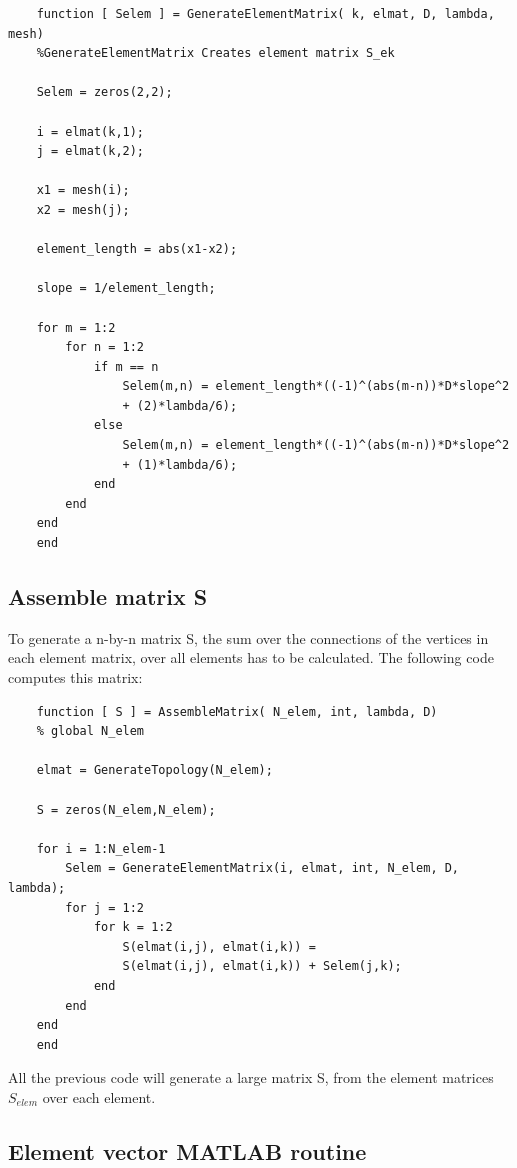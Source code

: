 \documentclass[a4paper]{report}
\begin{document}
\begin{lstlisting}
	function [ Selem ] = GenerateElementMatrix( k, elmat, D, lambda, mesh)
	%GenerateElementMatrix Creates element matrix S_ek
		
	Selem = zeros(2,2);
	
	i = elmat(k,1);
	j = elmat(k,2);
	
	x1 = mesh(i);
	x2 = mesh(j);
	
	element_length = abs(x1-x2);
	
	slope = 1/element_length; 
	
	for m = 1:2
		for n = 1:2
			if m == n
				Selem(m,n) = element_length*((-1)^(abs(m-n))*D*slope^2
				+ (2)*lambda/6);
			else
				Selem(m,n) = element_length*((-1)^(abs(m-n))*D*slope^2
				+ (1)*lambda/6);
			end
		end
	end
	end
\end{lstlisting}

\bigskip




\subsection{Assemble matrix S}
To generate a n-by-n matrix S, the sum over the connections of the vertices in each element matrix, over all elements has to be calculated. The following code computes this matrix:

\begin{lstlisting}
	function [ S ] = AssembleMatrix( N_elem, int, lambda, D)
	% global N_elem 
	
	elmat = GenerateTopology(N_elem);
	
	S = zeros(N_elem,N_elem);
	
	for i = 1:N_elem-1
		Selem = GenerateElementMatrix(i, elmat, int, N_elem, D, lambda);
		for j = 1:2
			for k = 1:2
				S(elmat(i,j), elmat(i,k)) =
				S(elmat(i,j), elmat(i,k)) +	Selem(j,k);
			end
		end
	end
	end

\end{lstlisting}



All the previous code will generate a large matrix S, from the element matrices $S_{elem}$ over each element.\\



\subsection{Element vector MATLAB routine}
\end{document}
